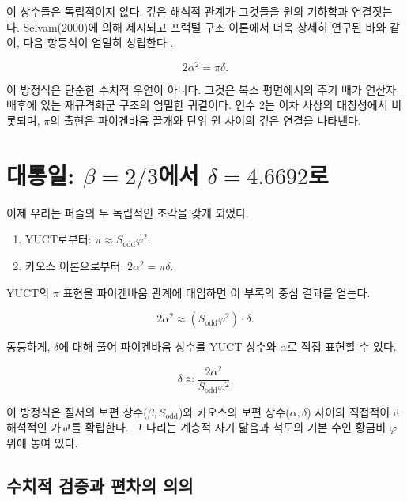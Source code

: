 \documentclass[11pt,a4paper]{article}
\begin{document}
	이 상수들은 독립적이지 않다. 깊은 해석적 관계가 그것들을 원의 기하학과 연결짓는다. Selvam(2000)에 의해 제시되고 프랙털 구조 이론에서 더욱 상세히 연구된 바와 같이, 다음 항등식이 엄밀히 성립한다 \cite{Selvam2000}.
	
	\begin{equation}
		2\alpha^2 = \pi \delta.
		\label{eq:feigenbaum-pi}
	\end{equation}
	
	이 방정식은 단순한 수치적 우연이 아니다. 그것은 복소 평면에서의 주기 배가 연산자 배후에 있는 재규격화군 구조의 엄밀한 귀결이다. 인수 2는 이차 사상의 대칭성에서 비롯되며, \(\pi\)의 출현은 파이겐바움 끌개와 단위 원 사이의 깊은 연결을 나타낸다.
	
	\section{대통일: \(\beta = 2/3\)에서 \(\delta = 4.6692\)로}
	
	이제 우리는 퍼즐의 두 독립적인 조각을 갖게 되었다.
	\begin{enumerate}
		\item YUCT로부터: \(\pi \approx S_{\mathrm{odd}}\varphi^2\).
		\item 카오스 이론으로부터: \(2\alpha^2 = \pi \delta\).
	\end{enumerate}
	
	YUCT의 \(\pi\) 표현을 파이겐바움 관계에 대입하면 이 부록의 중심 결과를 얻는다.
	
	\begin{equation}
		\boxed{2\alpha^2 \approx (S_{\mathrm{odd}}\varphi^2) \cdot \delta}.
		\label{eq:unification}
	\end{equation}
	
	동등하게, \(\delta\)에 대해 풀어 파이겐바움 상수를 YUCT 상수와 \(\alpha\)로 직접 표현할 수 있다.
	
	\begin{equation}
		\delta \approx \frac{2\alpha^2}{S_{\mathrm{odd}}\varphi^2}.
	\end{equation}
	
	이 방정식은 질서의 보편 상수(\(\beta, S_{\mathrm{odd}}\))와 카오스의 보편 상수(\(\alpha, \delta\)) 사이의 직접적이고 해석적인 가교를 확립한다. 그 다리는 계층적 자기 닮음과 척도의 기본 수인 황금비 \(\varphi\) 위에 놓여 있다.
	
	\subsection{수치적 검증과 편차의 의의}
	
\end{document}
